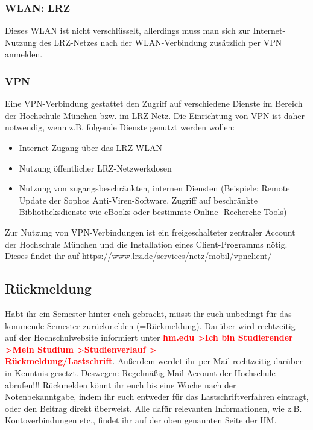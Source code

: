 \subsubsection{WLAN: LRZ}

Dieses WLAN ist nicht verschlüsselt, allerdings muss man sich zur Internet-Nutzung des LRZ-Netzes nach der WLAN-Verbindung zusätzlich per VPN anmelden.

\subsubsection{VPN}

Eine VPN-Verbindung gestattet den Zugriff auf verschiedene Dienste im Bereich der Hochschule München bzw. im LRZ-Netz. Die Einrichtung von VPN ist daher notwendig, wenn z.B. folgende Dienste genutzt werden wollen:

\begin{itemize}
	\item{Internet-Zugang über das LRZ-WLAN}
	\item{Nutzung öffentlicher LRZ-Netzwerkdosen}
	\item{Nutzung von zugangsbeschränkten, internen Diensten (Beispiele: Remote Update der Sophos Anti-Viren-Software, Zugriff auf beschränkte Bibliotheksdienste wie eBooks oder bestimmte Online- Recherche-Tools)}
\end{itemize}
Zur Nutzung von VPN-Verbindungen ist ein freigeschalteter zentraler Account der Hochschule München und die Installation eines Client-Programms nötig. Dieses findet ihr auf \url{https://www.lrz.de/services/netz/mobil/vpnclient/}

\subsection{Rückmeldung}

Habt ihr ein Semester hinter euch gebracht, müsst ihr euch unbedingt für das kommende Semester zurückmelden (=Rückmeldung). Darüber wird rechtzeitig auf der Hochschulwebsite informiert unter \textcolor{red}{\textbf{hm.edu \textgreater Ich bin Studierender \textgreater Mein Studium \textgreater Studienverlauf \textgreater\\ Rückmeldung/Lastschrift}}. Außerdem werdet ihr per Mail rechtzeitig darüber in Kenntnis gesetzt. Deswegen: Regelmäßig Mail-Account der Hochschule abrufen!!! Rückmelden könnt ihr euch bis eine Woche nach der Notenbekanntgabe, indem ihr euch entweder für das Lastschriftverfahren eintragt, oder den Beitrag direkt überweist.\doublebreak
Alle dafür relevanten Informationen, wie z.B. Kontoverbindungen etc., findet ihr auf der oben genannten Seite der HM.


